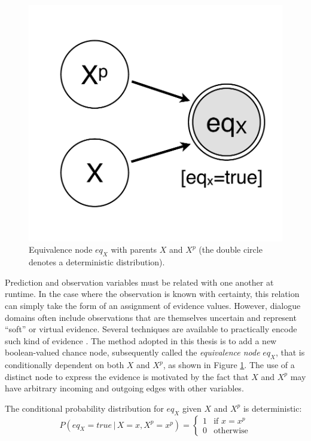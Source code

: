 \begin{figure}
\vspace{-5mm}
\centering
\includegraphics[scale=0.25]{imgs/prediction.pdf} 
\vspace{-2mm}
\caption{Equivalence node $\mathit{eq}_{X}$ with parents $X$ and $X^p$ (the double circle denotes a deterministic distribution).}
\label{fig:prediction}
\end{figure}

Prediction and observation variables must be related with one another at runtime.  In the case where the observation is known with certainty, this relation can simply take the form of an assignment of evidence values.  However, dialogue domains often include observations that are themselves uncertain and represent ``soft'' or virtual evidence.  Several techniques are available to practically encode such kind of evidence \citep{Pan06beliefupdate}. The method adopted in this thesis is to add a new boolean-valued chance node, subsequently called the \textit{equivalence node} $\mathit{eq}_{X}$, that is conditionally dependent on both $X$ and $X^p$, as shown in Figure \ref{fig:prediction}. The use of a distinct node to express the evidence is motivated by the fact that $X$ and $X^p$ may have arbitrary incoming and outgoing edges with other variables. 

The conditional probability distribution for $\mathit{eq}_X$ given $X$ and $X^p$ is deterministic:
\begin{equation}
P(\mathit{eq}_{X}\!=\!true \, | \, X\!=\!x, X^p\!=\!x^p) = \begin{cases}
1 & \text{if } x = x^p \\
0 & \text{otherwise}
\end{cases} \label{eq:equivdistrib}
\end{equation}

